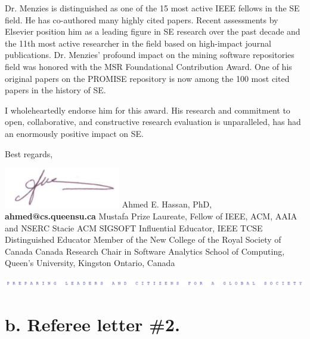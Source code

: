 \documentclass[10pt]{article}
\begin{document}
{Dr. Menzies is distinguished as one of the 15 most active IEEE
fellows in the SE field. He has co-authored many highly cited papers.
Recent assessments by Elsevier position him as a leading figure in
SE research over the past decade and the 11th most active researcher
in the field based on high-impact journal publications. Dr. Menzies'
profound impact on the mining software repositories field was honored
with the MSR Foundational Contribution Award. One of his original
papers on the PROMISE repository is now among the 100 most cited
papers in the history of SE.



I wholeheartedly endorse him for this award. His research and
commitment to open, collaborative, and constructive research
evaluation is unparalleled, has had an enormously positive impact
on SE.



Best regards,

\includegraphics[width=2in]{img/asig.png}\newline
Ahmed E. Hassan, PhD, {\bf ahmed@cs.queensu.ca}\newline
Mustafa Prize Laureate, Fellow of IEEE, ACM, AAIA and NSERC Stacie\newline
ACM SIGSOFT Influential Educator, IEEE TCSE Distinguished Educator\newline
Member of the New College of the Royal Society of Canada\newline
Canada Research Chair in Software Analytics\newline
School of Computing, Queen's University, Kingston Ontario, Canada 

\begin{center}
  \includegraphics[width=\linewidth]{img/afooter.png}  
\end{center}
}

\newpage
\section{b. Referee letter \#2.}
\end{document}
